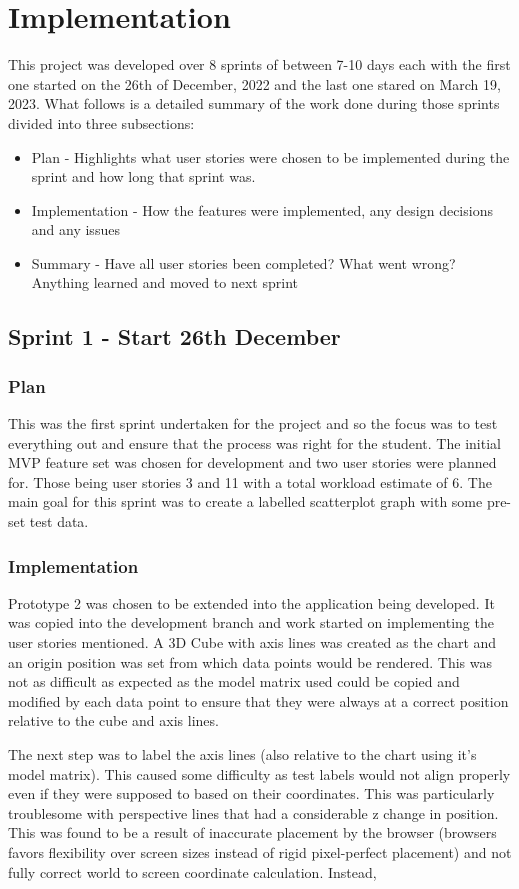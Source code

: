 \section{Implementation}
This project was developed over 8 sprints of between 7-10 days each with the first one started on the 26th of December, 2022 and the last one stared on March 19, 2023. What follows is a detailed summary of the work done during those sprints divided into three subsections:
\begin{itemize}
    \item Plan - Highlights what user stories were chosen to be implemented during the sprint and how long that sprint was.
    \item Implementation - How the features were implemented, any design decisions and any issues
    \item Summary - Have all user stories been completed? What went wrong? Anything learned and moved to next sprint
\end{itemize}

\subsection{Sprint 1 - Start 26th December}

\subsubsection{Plan}
This was the first sprint undertaken for the project and so the focus was to test everything out and ensure that the process was right for the student. The initial MVP feature set was chosen for development and two user stories were planned for. Those being user stories 3 and 11 with a total workload estimate of 6.
The main goal for this sprint was to create a labelled scatterplot graph with some pre-set test data.

\subsubsection{Implementation}
Prototype 2 was chosen to be extended into the application being developed. It was copied into the development branch and work started on implementing the user stories mentioned. A 3D Cube with axis lines was created as the chart and an origin position was set from which data points would be rendered. This was not as difficult as expected as the model matrix used could be copied and modified by each data point to ensure that they were always at a correct position relative to the cube and axis lines.

The next step was to label the axis lines (also relative to the chart using it's model matrix). This caused some difficulty as test labels would not align properly even if they were supposed to based on their coordinates. This was particularly troublesome with perspective lines that had a considerable z change in position. This was found to be a result of inaccurate placement by the browser (browsers favors flexibility over screen sizes instead of rigid pixel-perfect placement) and not fully correct world to screen coordinate calculation. Instead,
